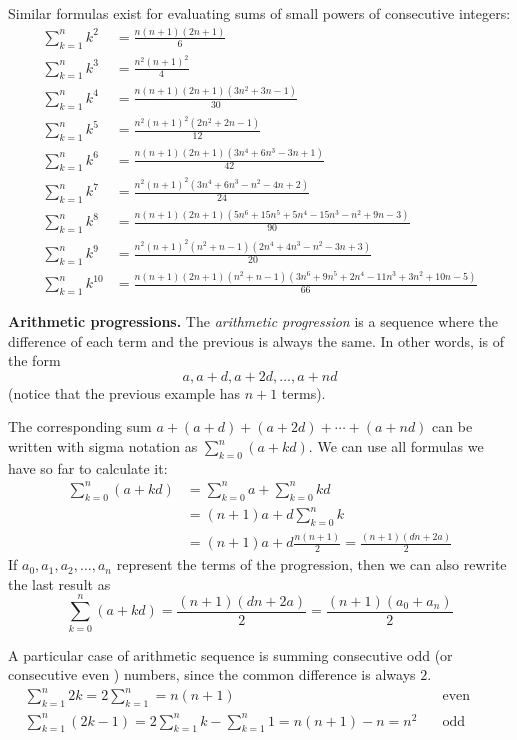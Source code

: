 \documentclass[12pt]{article}
\begin{document}
Similar formulas exist for evaluating sums of small powers of consecutive integers:
\begin{align*}
\sum_{k=1}^n k^2 &= \frac{n(n+1)(2n+1)}{6}\\
\sum_{k=1}^n k^3 &= \frac{n^2(n+1)^2}{4}\\
\sum_{k=1}^n k^4 &= \frac{n(n+1)(2n+1)(3n^2+3n-1)}{30}\\
\sum_{k=1}^n k^5 &= \frac{n^2(n+1)^2(2n^2+2n-1)}{12}\\
\sum_{k=1}^n k^6 &= \frac{n(n+1)(2n+1)(3n^4+6n^3-3n +1)}{42}\\
\sum_{k=1}^n k^7 &= \frac{n^2(n+1)^2(3n^4 +6n^3-n^2 - 4n +2)}{24}\\
\sum_{k=1}^n k^8 &= \frac{n(n+1)(2n+1)(5n^6 + 15n^5 +5n^4 -15n^3 -n^2+9n -3)}{90}\\
\sum_{k=1}^n k^9 &= \frac{n^2(n+1)^2(n^2+n-1)(2n^4 +4n^3-n^2 - 3n +3)}{20}\\
\sum_{k=1}^n k^{10} &= \frac{n(n+1)(2n+1)(n^2+n-1)(3n^6+9n^5 +2n^4-11n^3+3n^2+10n-5)}{66}
\end{align*}

\medskip\textbf{Arithmetic progressions.}
The \emph{arithmetic progression} is a sequence where the difference of each term and the previous is always the same. In other words, is of the form \[a,a+d,a+2d,\ldots , a+nd\] (notice that the previous example has $n+1$ terms).

The corresponding sum $a+(a+d) + (a+2d) + \cdots + (a+nd)$ can be written with sigma notation as
$\sum_{k=0}^n (a+kd)$. We can use all formulas we have so far to calculate it:
\begin{align*}
\sum_{k=0}^n (a+kd) &= \sum_{k=0}^n a + \sum_{k=0}^n kd\\
&=(n+1)a + d\sum_{k=0}^n k \\
&=(n+1)a + d\frac{n(n+1)}{2} = \frac{(n+1)(dn +2a)}{2}
\end{align*}
If $a_0,a_1,a_2,\ldots,a_n$ represent the terms of the progression, then we can also rewrite the last result as
\[
\sum_{k=0}^n (a+kd) = \frac{(n+1)(dn +2a)}{2}=\frac{(n+1)(a_0+a_n)}{2}
\]

A particular case of arithmetic sequence is summing consecutive odd (or consecutive even ) numbers, since the common difference is always $2$. 
\begin{align*}
&\sum_{k=1}^n 2k = 2\sum_{k=1}^n = n(n+1)&\quad\mbox{even numbers}\\
&\sum_{k=1}^n (2k-1) = 2\sum_{k=1}^n k -\sum_{k=1}^n 1= n(n+1)-n = n^2&\quad\mbox{odd numbers}\\
\end{align*}
\end{document}
